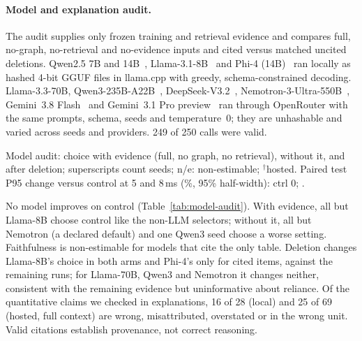 \paragraph{Model and explanation audit.}
The audit supplies only frozen training and retrieval evidence and compares full, no-graph, no-retrieval and no-evidence inputs and cited versus matched uncited deletions. Qwen2.5 7B and 14B~\cite{Qwen2024Qwen25}, Llama-3.1-8B~\cite{Grattafiori2024Llama3} and Phi-4 (14B)~\cite{Abdin2024Phi4} ran locally as hashed 4-bit GGUF files in llama.cpp with greedy, schema-constrained decoding. Llama-3.3-70B, Qwen3-235B-A22B~\cite{Yang2025Qwen3}, DeepSeek-V3.2~\cite{DeepSeek2025V32}, Nemotron-3-Ultra-550B~\cite{NVIDIA2026Nemotron3Ultra}, Gemini~3.8 Flash~\cite{Google2026Gemini38Flash} and Gemini~3.1 Pro preview~\cite{Google2026Gemini31Pro} ran through OpenRouter with the same prompts, schema, seeds and temperature~0; they are unhashable and varied across seeds and providers. 249 of 250 calls were valid.

\begin{table}[t]
\centering\footnotesize\setlength{\tabcolsep}{2.5pt}
\caption{Model audit: choice with evidence (full, no graph, no retrieval), without it, and after deletion; superscripts count seeds; n/e: non-estimable; $^\dagger$hosted. Paired test P95 change versus control at 5 and 8\,ms (\%, 95\% half-width): ctrl 0; \protect\unskip.}
\label{tab:model-audit}
\begin{adjustbox}{max width=\columnwidth}

\end{adjustbox}
\end{table}

No model improves on control (Table~\ref{tab:model-audit}). With evidence, all but Llama-8B choose control like the non-LLM selectors; without it, all but Nemotron (a declared default) and one Qwen3 seed choose a worse setting. Faithfulness is non-estimable for models that cite the only table. Deletion changes Llama-8B's choice in both arms and Phi-4's only for cited items, against the remaining runs; for Llama-70B, Qwen3 and Nemotron it changes neither, consistent with the remaining evidence but uninformative about reliance. Of the quantitative claims we checked in explanations, 16 of 28 (local) and 25 of 69 (hosted, full context) are wrong, misattributed, overstated or in the wrong unit. Valid citations establish provenance, not correct reasoning.
